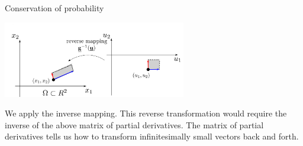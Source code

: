 \begin{frame}{Conservation of probability}

\svspace{-3mm}


\svspace{-3mm}





\pause

\svspace{-7mm}

\begin{center}
\includegraphics[width=0.6\textwidth]{img/reverse.pdf}
\end{center}

We apply the inverse mapping. 
This reverse transformation would require the inverse of the above matrix of partial derivatives.
The matrix of partial derivatives tells us how to transform infinitesimally small vectors back and forth.



\end{frame}

